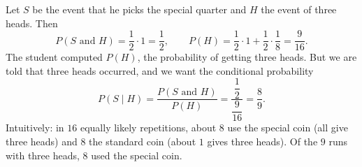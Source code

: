 Let $S$ be the event that he picks the special quarter and $H$ the event of three heads. Then
\[P(S\text{ and }H)=\dfrac12\cdot1=\dfrac12,\qquad P(H)=\dfrac12\cdot1+\dfrac12\cdot\dfrac18=\dfrac{9}{16}.\]
The student computed $P(H)$, the probability of getting three heads. But we are told that three heads occurred, and we want the conditional probability
\[P(S\mid H)=\dfrac{P(S\text{ and }H)}{P(H)}=\dfrac{\dfrac12}{\dfrac{9}{16}}=\boxed{\dfrac89}.\]
Intuitively: in $16$ equally likely repetitions, about $8$ use the special coin (all give three heads) and $8$ the standard coin (about $1$ gives three heads). Of the $9$ runs with three heads, $8$ used the special coin.
